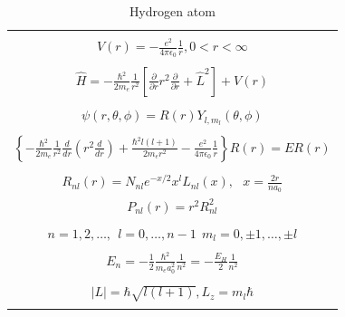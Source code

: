 \message{ !name(Outline.tex)}\documentclass[11pt]{article}
\begin{document}
\begin{outline}
\begin{outline}
  \end{outline}
\begin{table}[tbh]
   \begin{center}
   \caption{Hydrogen atom}
    \label{Hydrogen atom}
\begin{tabular}[h]{|c|}
\hline
 \\
$\displaystyle       V(r) = -\frac{e^2}{4\pi\epsilon_0}\frac{1}{r}, 0 < r< \infty$ \\
 \\
$\displaystyle     \hat H = -\frac{\hbar^2}{2m_e}\frac{1}{r^2}\left [
  \frac{\partial}{\partial r}r^2\frac{\partial}{\partial r} + \hat L^2 \right ] +V(r)$ \\
\\
$\displaystyle \psi(r,\theta,\phi) = R(r)Y_{l,m_l}(\theta,\phi) $ \\
\\
$\displaystyle   \left \{ -\frac{\hbar^2}{2m_e}\frac{1}{r^2}
            \frac{d}{d r} \left ( r^2 \frac{d}{dr}\right ) + \frac{\hbar^2
              l(l+1)}{2 m_e r^2}
          -\frac{e^2}{4\pi\epsilon_0}\frac{1}{r}\right \} R(r) = E R(r) $ \\
\\
$\displaystyle R_{nl}(r) = N_{nl} e^{-x/2} x^l L_{nl}(x),\ \ \  x = \frac{2 r}{n a_0} $
\\
$\displaystyle P_{nl}(r) = r^2 R_{nl}^2 $
\\
\\
$\displaystyle n = 1, 2, \ldots,\ \  l = 0, \ldots, n-1 \ \ m_l = 0,\pm 1, \ldots, \pm l$
\\
\\
$\displaystyle     E_{n}=-\frac{1}{2}\frac{\hbar^2}{m_e a_0^2}\frac{1}{n^2} =-\frac{E_H}{2}\frac{1}{n^2}$ \\
 \\
$\displaystyle |L| = \hbar \sqrt{l(l+1)}, L_z = m_l \hbar $ \\
\\
\hline
\end{tabular}
 \end{center}
\end{table}


\end{outline}
\end{document}
